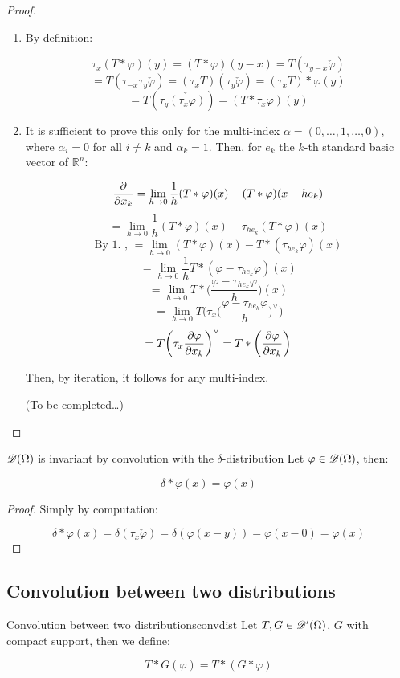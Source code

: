 \begin{proof}
    \begin{enumerate}
        \item By definition: 
        
        \[\tau_x(T\ast\varphi)(y)=(T\ast\varphi)(y-x)=T(\tau_{y-x}\check{\varphi})\]
        \[=T(\tau_{-x}\tau_{y}\check{\varphi})=(\tau_xT)(\tau_{y}\check{\varphi})=(\tau_xT)\ast\varphi(y)\]
        \[=T(\tau_y\check{(\tau_x\varphi)}) = (T\ast\tau_x\varphi)(y)\]

        \item It is sufficient to prove this only for the multi-index $\alpha=(0,\dots,1,\dots,0)$, where $\alpha_i=0$ for all $i\neq k$ and $\alpha_k = 1$. Then, for $e_k$ the $k$-th standard basic vector of $\mathbb{R}^n$:
        
        \[\pdv{}{x_k}(T\ast\varphi) = \lim_{h\rightarrow0}\frac{1}{h}(T\ast\varphi)(x)-(T\ast\varphi)(x-he_k)\]
        \[=\lim_{h\rightarrow0}\frac{1}{h}(T\ast\varphi)(x)-\tau_{he_k}(T\ast\varphi)(x)\]
        \[\text{By 1. , }  =\lim_{h\rightarrow0}(T\ast\varphi)(x)-T\ast(\tau_{he_k}\varphi)(x) \]
        \[=\lim_{h\rightarrow0}\frac{1}{h}T\ast(\varphi-\tau_{he_k}\varphi)(x)\]
        \[=\lim_{h\rightarrow0}T\ast\bigg(\frac{\varphi-\tau_{he_k}\varphi}{h}\bigg)(x)\]
        \[=\lim_{h\rightarrow0}T\bigg(\tau_x\bigg(\frac{\varphi-\tau_{he_k}\varphi}{h}\bigg)^\vee\bigg)\]
        \[=T\bigg(\tau_x\pdv{\varphi}{x_k}\bigg)^\vee = T\ast\bigg(\pdv{\varphi}{x_k}\bigg)\]

        Then, by iteration, it follows for any multi-index.

        (To be completed\dots)
    \end{enumerate}
\end{proof}

\begin{lemma}{$\mathscr{D}(\Omega)$ is invariant by convolution with the $\delta$-distribution}{}
    Let $\varphi\in\mathscr{D}(\Omega)$, then:

    \[\delta\ast\varphi(x) = \varphi(x)\]

\end{lemma}
\begin{proof}
    Simply by computation:

    \[\delta\ast\varphi(x) = \delta(\tau_x\check{\varphi}) = \delta(\varphi(x-y)) = \varphi(x-0) = \varphi(x)\]

\end{proof}

\subsection{Convolution between two distributions}

\begin{definition}{Convolution between two distributions}{convdist}
    Let $T,G\in\mathscr{D}'(\Omega)$, $G$ with compact support, then we define:

    \[T\ast G(\varphi) = T\ast(G\ast\varphi)\]
\end{definition}





